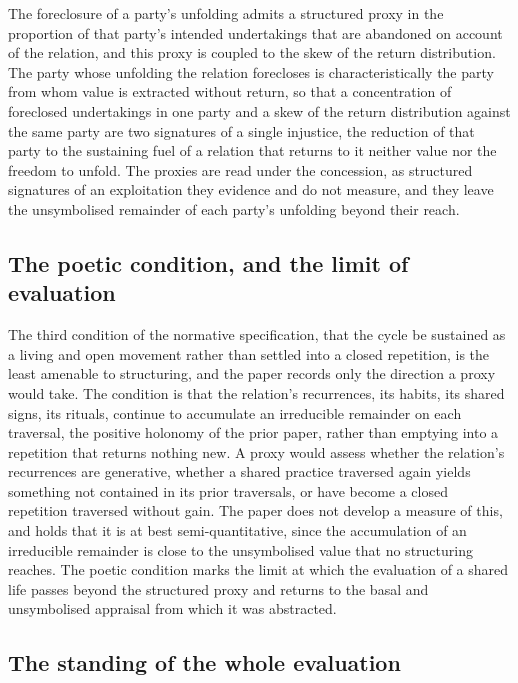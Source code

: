 \begin{claim}
The foreclosure of a party's unfolding admits a structured proxy in the proportion of that party's intended undertakings that are abandoned on account of the relation, and this proxy is coupled to the skew of the return distribution. The party whose unfolding the relation forecloses is characteristically the party from whom value is extracted without return, so that a concentration of foreclosed undertakings in one party and a skew of the return distribution against the same party are two signatures of a single injustice, the reduction of that party to the sustaining fuel of a relation that returns to it neither value nor the freedom to unfold. The proxies are read under the concession, as structured signatures of an exploitation they evidence and do not measure, and they leave the unsymbolised remainder of each party's unfolding beyond their reach.
\end{claim}

\subsection{The poetic condition, and the limit of evaluation}
\label{p11:sec:ev-poetic}

The third condition of the normative specification, that the cycle be sustained as a living and open movement rather than settled into a closed repetition, is the least amenable to structuring, and the paper records only the direction a proxy would take. The condition is that the relation's recurrences, its habits, its shared signs, its rituals, continue to accumulate an irreducible remainder on each traversal, the positive holonomy of the prior paper, rather than emptying into a repetition that returns nothing new. A proxy would assess whether the relation's recurrences are generative, whether a shared practice traversed again yields something not contained in its prior traversals, or have become a closed repetition traversed without gain. The paper does not develop a measure of this, and holds that it is at best semi-quantitative, since the accumulation of an irreducible remainder is close to the unsymbolised value that no structuring reaches. The poetic condition marks the limit at which the evaluation of a shared life passes beyond the structured proxy and returns to the basal and unsymbolised appraisal from which it was abstracted.

\subsection{The standing of the whole evaluation}
\label{p11:sec:ev-standing}

